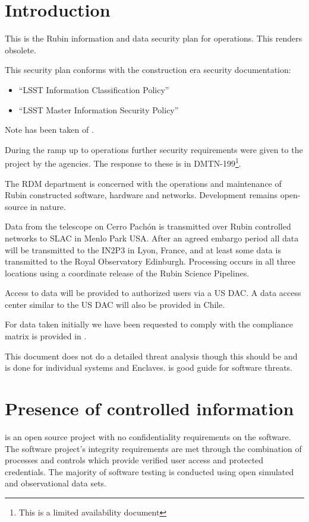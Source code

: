 

\section{Introduction}
This is the Rubin information and data security plan for operations.
This renders  obsolete.

This security plan conforms with the construction era security documentation:
\begin{itemize}
\item “LSST Information Classification Policy” 
\item “LSST Master Information Security Policy” 
\end{itemize}

Note has been taken of \cite{TCISSG}.

During the ramp up to operations further security requirements were given to the project by the agencies.
The response to these is in \gls{DMTN}-199\footnote{This is a limited availability document}.

The \gls{RDM} department is concerned with the operations and maintenance  of Rubin constructed software, hardware and networks.
Development remains open-source in nature.

Data from the telescope on Cerro Pach\'{o}n is transmitted over Rubin controlled networks to \gls{SLAC} in  Menlo Park USA.
After an agreed embargo period all data will be transmitted to the \gls{IN2P3} in Lyon, France, and at least some data is transmitted to the Royal Observatory Edinburgh.
Processing occurs in all three locations using a coordinate release of the Rubin \gls{Science Pipelines}.

Access to data will be provided to authorized  users via a US \gls{DAC}.
A data access center similar to the \gls{US} \gls{DAC} will also be provided in Chile.

For data taken initially we have been requested to comply with  the compliance matrix is provided in  .


This document does not do a detailed threat analysis though this should be and is done for individual systems and \gls{Enclave}s. \cite{TCISSG} is good guide for software threats.

\section{Presence of controlled information}\label{sec:cui}
\VRO is an open source project with no confidentiality requirements on the software.
The software project’s integrity requirements are met through the combination of
processes and controls which provide verified user access and protected credentials.
The majority of software testing is conducted using open simulated and observational data sets.

